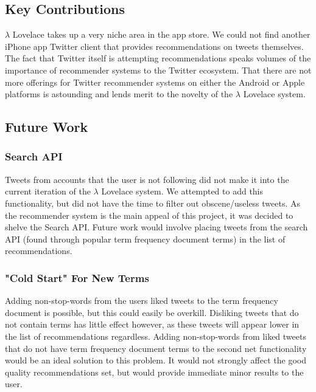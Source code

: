 \documentclass{article}
\begin{document}
\subsection{Key Contributions} %
$\lambda$ Lovelace takes up a very niche area in the app store. We could not find another iPhone app Twitter client that provides recommendations on tweets themselves. The fact that Twitter itself is attempting recommendations speaks volumes of the importance of recommender systems to the Twitter ecosystem. That there are not more offerings for Twitter recommender systems on either the Android or Apple platforms is astounding and lends merit to the novelty of the $\lambda$ Lovelace system.

\subsection{Future Work} %

\subsubsection*{Search API} %
Tweets from accounts that the user is not following did not make it into the current iteration of the $\lambda$ Lovelace system. We attempted to add this functionality, but did not have the time to filter out obscene/useless tweets. As the recommender system is the main appeal of this project, it was decided to shelve the Search API. Future work would involve placing tweets from the search API (found through popular term frequency document terms) in the list of recommendations.

\subsubsection*{"Cold Start" For New Terms} %
Adding non-stop-words from the users liked tweets to the term frequency document is possible, but this could easily be overkill. Disliking tweets that do not contain terms has little effect however, as these tweets will appear lower in the list of recommendations regardless. Adding non-stop-words from liked tweets that do not have term frequency document terms to the second net functionality would be an ideal solution to this problem. It would not strongly affect the good quality recommendations set, but would provide immediate minor results to the user. 
\end{document}
